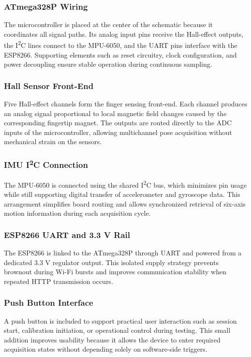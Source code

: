 \documentclass[12pt,a4paper]{report}
\begin{document}
\subsubsection{ATmega328P Wiring}
The microcontroller is placed at the center of the schematic because it coordinates all signal paths. Its analog input pins receive the Hall-effect outputs, the I\textsuperscript{2}C lines connect to the MPU-6050, and the UART pins interface with the ESP8266. Supporting elements such as reset circuitry, clock configuration, and power decoupling ensure stable operation during continuous sampling.

\subsubsection{Hall Sensor Front-End}
Five Hall-effect channels form the finger sensing front-end. Each channel produces an analog signal proportional to local magnetic field changes caused by the corresponding fingertip magnet. The outputs are routed directly to the ADC inputs of the microcontroller, allowing multichannel pose acquisition without mechanical strain on the sensors.

\subsubsection{IMU I\textsuperscript{2}C Connection}
The MPU-6050 is connected using the shared I\textsuperscript{2}C bus, which minimizes pin usage while still supporting digital transfer of accelerometer and gyroscope data. This arrangement simplifies board routing and allows synchronized retrieval of six-axis motion information during each acquisition cycle.

\subsubsection{ESP8266 UART and 3.3 V Rail}
The ESP8266 is linked to the ATmega328P through UART and powered from a dedicated 3.3 V regulator output. This isolated supply strategy prevents brownout during Wi-Fi bursts and improves communication stability when repeated HTTP transmission occurs.

\subsubsection{Push Button Interface}
A push button is included to support practical user interaction such as session start, calibration initiation, or operational control during testing. This small addition improves usability because it allows the device to enter required acquisition states without depending solely on software-side triggers.
\end{document}
